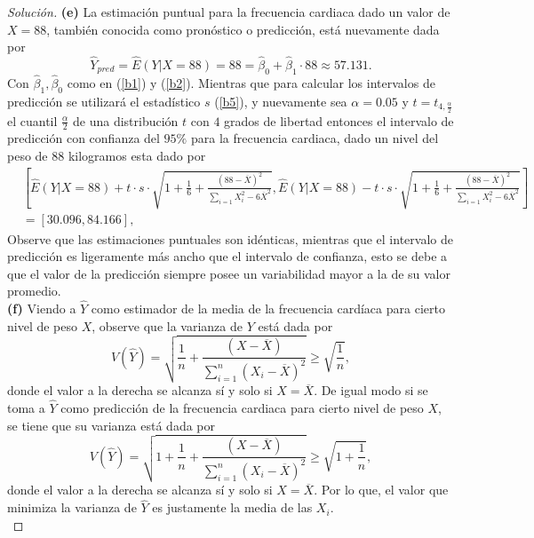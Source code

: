 \documentclass[10.5pt,notitlepage]{article}
\newenvironment{solucion}
  {\begin{proof}[Solución]}
  {\end{proof}}
\newcommand{\corch}[1]{\left[ #1 \right]}
\begin{document}
\begin{solucion}
\noindent\textbf{(e)} La estimación puntual para la frecuencia cardiaca dado un valor de \(X = 88\), también conocida como pronóstico o predicción, está nuevamente dada por 
\begin{equation*}
    \hat{Y}_{pred}=\widehat{E}(Y|X = 88)= 88 = \hat{\beta}_0 + \hat{\beta}_1 \cdot 88 \approx 57.131.  
\end{equation*}
Con \(\hat{\beta}_1,\hat{\beta}_0\) como en (\ref{b1}) y (\ref{b2}). Mientras que para calcular los intervalos de predicción se utilizará el estadístico \(s\) (\ref{b5}), y nuevamente sea \(\alpha = 0.05\) y \(t = t_{4,\frac{\alpha}{2}}\) el cuantil \(\frac{\alpha}{2}\) de una distribución \(t\) con \(4\) grados de libertad entonces el intervalo de predicción con confianza del \(95\%\) para la frecuencia cardiaca, dado un nivel del peso de \(88\) kilogramos esta dado por 
\begin{align}\label{b7}
    &\corch{\widehat{E}(Y|X = 88) + t\cdot s\cdot\sqrt{1 + \frac{1}{6} + \frac{(88 - \overline{X})^2}{\sum_{i=1}X_{i}^{2} - 6\overline{X}^2}}  , \widehat{E}(Y|X = 88) -t\cdot s\cdot\sqrt{1+ \frac{1}{6} + \frac{(88 - \overline{X})^2}{\sum_{i=1}X_{i}^{2} - 6\overline{X}^2}} }\nonumber\\ 
    &= [30.096,84.166],
\end{align}
Observe que las estimaciones puntuales son idénticas, mientras que el intervalo de predicción es ligeramente más ancho que el intervalo de confianza, esto se debe a que el valor de la predicción siempre posee un variabilidad mayor a la de su valor promedio.\\ 

\noindent\textbf{(f)} Viendo a \(\hat{Y}\) como estimador de la media de la frecuencia cardíaca para cierto nivel de peso \(X\), observe que la varianza de \(Y\) está dada por 
\[
V(\hat{Y}) = \sqrt{\frac{1}{n} + \frac{(X - \overline{X})}{\sum_{i=1}^n(X_i - \overline{X})^2}} \geq \sqrt{\frac{1}{n}}, 
\]
donde el valor a la derecha se alcanza sí y solo si \(X = \overline{X}\). De igual modo si se toma a \(\hat{Y}\) como predicción de la frecuencia cardiaca para cierto nivel de peso \(X\), se tiene que su varianza está dada por
\[
V(\hat{Y}) = \sqrt{1 + \frac{1}{n} + \frac{(X - \overline{X})}{\sum_{i=1}^n(X_i - \overline{X})^2}} \geq \sqrt{ 1 +\frac{1}{n}}, 
\]
donde el valor a la derecha se alcanza sí y solo si \(X = \overline{X}\). Por lo que, el valor que minimiza la varianza de \(\hat{Y}\) es justamente la media de las \(X_i\).\\ 


\end{solucion}
\end{document}
